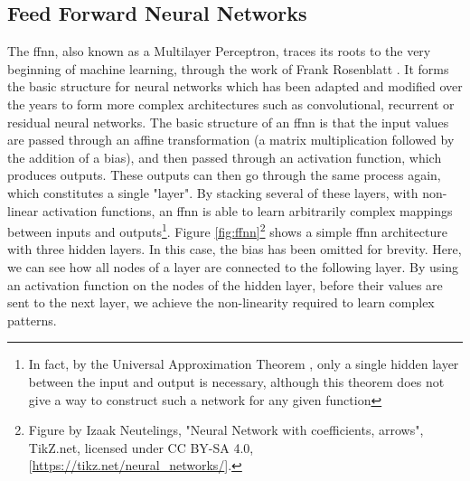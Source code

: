 \documentclass[UKenglish]{uiomasterthesis} %
\theoremstyle{definition}
\begin{document}
\subsection{Feed Forward Neural Networks}

The \ac{ffnn}, also known as a Multilayer Perceptron, traces its roots to the very beginning of machine learning, through the work of Frank Rosenblatt \cite{rosenblatt}. It forms the basic structure for neural networks which has been adapted and modified over the years to form more complex architectures such as convolutional, recurrent or residual neural networks. The basic structure of an \ac{ffnn} is that the input values are passed through an affine transformation (a matrix multiplication followed by the addition of a bias), and then passed through an activation function, which produces outputs. These outputs can then go through the same process again, which constitutes a single "layer". By stacking several of these layers, with non-linear activation functions, an \ac{ffnn} is able to learn arbitrarily complex mappings between inputs and outputs\footnote{In fact, by the Universal Approximation Theorem \cite{uat}, only a single hidden layer between the input and output is necessary, although this theorem does not give a way to construct such a network for any given function}. Figure \ref{fig:ffnn}\footnote{Figure by Izaak Neutelings, "Neural Network with coefficients, arrows", TikZ.net, licensed under CC BY-SA 4.0, [\url{https://tikz.net/neural\_networks/}].} shows a simple \ac{ffnn} architecture with three hidden layers. In this case, the bias has been omitted for brevity. Here, we can see how all nodes of a layer are connected to the following layer. By using an activation function on the nodes of the hidden layer, before their values are sent to the next layer, we achieve the non-linearity required to learn complex patterns.
\end{document}
